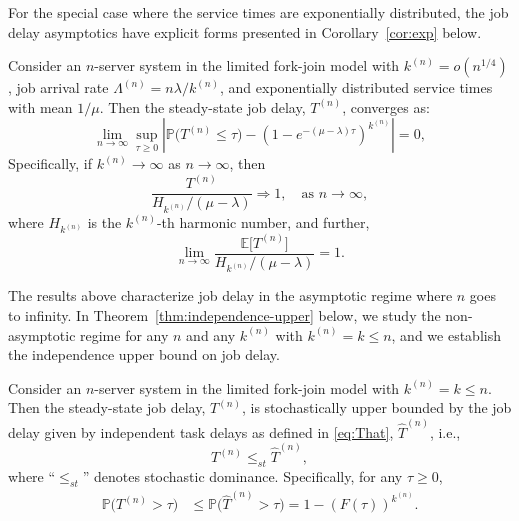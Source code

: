\documentclass[sigconf]{acmart}
\renewcommand{\Pr}{\mathbb{P}} %
\newcommand{\expect}{\mathbb{E}} %
\newcommand{\supn}{^{(n)}}
\newcommand{\tod}{\Rightarrow}
\begin{document}
For the special case where the service times are exponentially distributed, the job delay asymptotics have explicit forms presented in Corollary~\ref{cor:exp} below.
\begin{corollary}\label{cor:exp}
Consider an $n$-server system in the limited fork-join model with $k\supn=o(n^{1/4})$, job arrival rate $\Lambda\supn=n\lambda/k\supn$, and exponentially distributed service times with mean $1/\mu$.  Then the steady-state job delay, $T\supn$, converges as:
\begin{equation}\label{eq:converge-cdf}
\lim_{n\to\infty}\sup_{\tau\ge 0}\left|\Pr\bigl(T\supn\le \tau\bigr)-\left(1-e^{-(\mu-\lambda)\tau}\right)^{k\supn}\right|=0,
\end{equation}
Specifically, if $k\supn\to\infty$ as $n\to\infty$, then
\begin{equation}\label{eq:converge-in-distr}
\frac{T\supn}{H_{k\supn}/(\mu-\lambda)}\tod 1,\quad\text{as }n\to\infty,
\end{equation}
where $H_{k\supn}$ is the $k\supn$-th harmonic number, and further,
\begin{equation}\label{eq:converge-expectation}
\lim_{n\to\infty}\frac{\expect\bigl[T\supn\bigr]}{H_{k\supn}/(\mu-\lambda)}=1.
\end{equation}
\end{corollary}


The results above characterize job delay in the asymptotic regime where $n$ goes to infinity.  In Theorem~\ref{thm:independence-upper} below, we study the non-asymptotic regime for any $n$ and any $k\supn$ with $k\supn=k\le n$, and we establish the independence upper bound on job delay.

\begin{theorem}\label{thm:independence-upper}
Consider an $n$-server system in the limited fork-join model with $k\supn=k\le n$. Then the steady-state job delay, $T\supn$, is stochastically upper bounded by the job delay given by independent task delays as defined in \eqref{eq:That}, $\hat{T}\supn$, i.e.,
\begin{equation}\label{eq:ind-upper}
T\supn\le_{st} \hat{T}\supn,
\end{equation}
where ``$\le_{st}$'' denotes stochastic dominance. Specifically, for any $\tau\ge 0$,
\begin{align}
\Pr\bigl(T\supn > \tau\bigr)&\le\Pr\bigl(\hat{T}\supn > \tau\bigr) = 1-\left(F(\tau)\right)^{k\supn}.\label{eq:ind-upper-tail}
\end{align}
\end{theorem}
\end{document}
